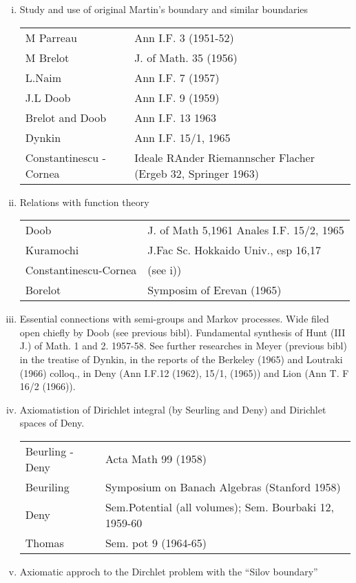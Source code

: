 \begin{enumerate}[i)]
\item Study and use of original Martin's boundary and similar boundaries

  \begin{tabular}{lp{5cm}<{\raggedright}}
    {M Parreau} & Ann I.F. 3 (1951-52)\\
    {M Brelot} & J. of Math.  35 (1956)\\
    {L.Naim} & Ann I.F. 7 (1957)\\
    {J.L Doob} & Ann I.F. 9 (1959)\\
    {Brelot and Doob} & Ann I.F. 13 1963\\
    {Dynkin} & Ann I.F. 15/1, 1965\\
    {Constantinescu -Cornea} & Ideale RAnder Riemannscher Flacher
    (Ergeb 32, Springer 1963)
  \end{tabular}
\item Relations with function theory

  \begin{tabular}{lp{5.8cm}<{\raggedright}}
  {Doob}&  J. of Math 5,1961 Anales I.F. 15/2, 1965 \\
  {Kuramochi} & J.Fac Sc. Hokkaido Univ., esp 16,17\\
  Constantinescu-Cornea & (see i))\\
  {Borelot} & Symposim of Erevan  (1965)
  \end{tabular}\pageoriginale
\item  Essential connections with semi-groups and Markov processes.\break
  Wide filed open chiefly by Doob (see previous bibl). Fundamental
  synthesis of Hunt (III J.) of Math. 1 and 2. 1957-58. See
  further researches in Meyer (previous bibl) in the treatise of Dynkin,
  in the reports of the Berkeley (1965) and Loutraki (1966) colloq.,
  in Deny  (Ann I.F.12 (1962), 15/1, (1965)) and Lion (Ann T. F 16/2
  (1966)). 
\item Axiomatistion of Dirichlet integral (by Seurling and Deny) and
  Dirichlet spaces of Deny. 

  \begin{tabular}{lp{6cm}<{\raggedright}}
    {Beurling -Deny} & Acta Math 99 (1958)\\
    {Beuriling} & Symposium on Banach Algebras (Stanford 1958)\\ 
    {Deny} & Sem.Potential (all volumes); Sem. Bourbaki 12, 1959-60\\
    {Thomas} & Sem. pot 9 (1964-65)
  \end{tabular}
\item Axiomatic approch to the Dirchlet problem with the ``Silov boundary''


\end{enumerate}
